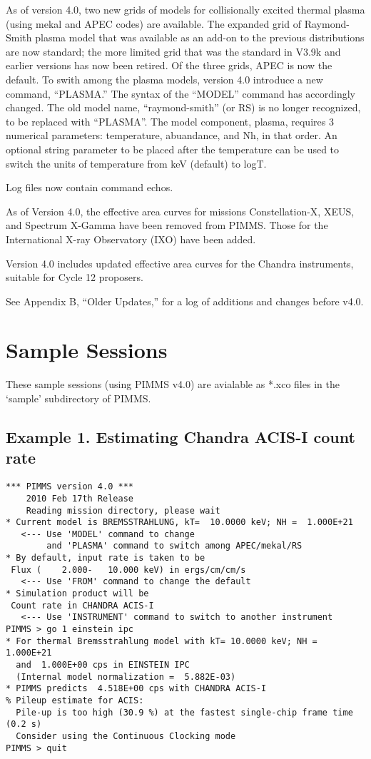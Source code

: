 \documentclass[11pt]{article}
\begin{document}
As of version 4.0, two new grids of models for collisionally excited thermal
plasma (using mekal and APEC codes) are available.  The expanded grid of
Raymond-Smith plasma model that was available as an add-on to the previous
distributions are now standard; the more limited grid that was the standard
in V3.9k and earlier versions has now been retired.  Of the three grids,
APEC is now the default.  To swith among the plasma models, version 4.0
introduce a new command, ``PLASMA.''  The syntax of the ``MODEL'' command
has accordingly changed.  The old model name, ``raymond-smith'' (or RS) is
no longer recognized, to be replaced with ``PLASMA''.  The model component,
plasma, requires 3 numerical parameters: temperature, abuandance, and Nh,
in that order.  An optional string parameter to be placed after the
temperature can be used to switch the units of temperature from keV
(default) to logT.

Log files now contain command echos.

As of Version 4.0, the effective area curves for missions Constellation-X,
XEUS, and Spectrum X-Gamma have been removed from PIMMS.  Those for the
International X-ray Observatory (IXO) have been added.

Version 4.0 includes updated effective area curves for the Chandra
instruments, suitable for Cycle 12 proposers.

See Appendix B, ``Older Updates,'' for a log of additions and changes
before v4.0.

\section{Sample Sessions}

These sample sessions (using PIMMS v4.0) are avialable as *.xco files
in the `sample' subdirectory of PIMMS.

\subsection*{Example 1. Estimating Chandra ACIS-I count rate}

\begin{verbatim}
*** PIMMS version 4.0 ***
    2010 Feb 17th Release
    Reading mission directory, please wait
* Current model is BREMSSTRAHLUNG, kT=  10.0000 keV; NH =  1.000E+21
   <--- Use 'MODEL' command to change
        and 'PLASMA' command to switch among APEC/mekal/RS
* By default, input rate is taken to be
 Flux (    2.000-   10.000 keV) in ergs/cm/cm/s
   <--- Use 'FROM' command to change the default
* Simulation product will be
 Count rate in CHANDRA ACIS-I
   <--- Use 'INSTRUMENT' command to switch to another instrument
PIMMS > go 1 einstein ipc
* For thermal Bremsstrahlung model with kT= 10.0000 keV; NH =  1.000E+21
  and  1.000E+00 cps in EINSTEIN IPC
  (Internal model normalization =  5.882E-03)
* PIMMS predicts  4.518E+00 cps with CHANDRA ACIS-I
% Pileup estimate for ACIS:
  Pile-up is too high (30.9 %) at the fastest single-chip frame time (0.2 s)
  Consider using the Continuous Clocking mode
PIMMS > quit
\end{verbatim}
\end{document}
